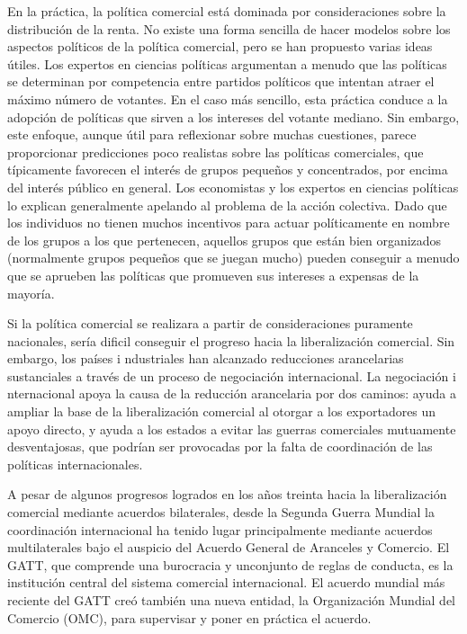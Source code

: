 \documentclass[10pt,a4paper]{article}
\begin{document}
{    En la práctica, la política comercial está dominada por consideraciones sobre la distribución de la renta. No existe una forma sencilla de hacer modelos sobre los aspectos políticos de la política comercial, pero se han propuesto varias ideas útiles. Los expertos en ciencias políticas argumentan a menudo que las políticas se determinan por competencia entre partidos políticos que intentan atraer el máximo número de votantes. En el caso más sencillo, esta práctica conduce a la adopción de políticas que sirven a los intereses del votante mediano. Sin embargo, este enfoque, aunque útil para reflexionar sobre muchas cuestiones, parece proporcionar predicciones poco realistas sobre las políticas comerciales, que típicamente favorecen el interés de grupos pequeños y concentrados, por encima del interés público en general. Los economistas y los expertos en ciencias políticas lo explican generalmente apelando al problema de la acción colectiva. Dado que los individuos no tienen muchos incentivos para actuar políticamente en nombre de los grupos a los que pertenecen, aquellos grupos que están bien organizados (normalmente grupos pequeños que se juegan mucho) pueden conseguir a menudo que se aprueben las políticas que promueven sus intereses a expensas de la mayoría. 
    
    Si la política comercial se realizara a partir de consideraciones puramente nacionales, sería dificil conseguir el progreso hacia la liberalización comercial. Sin embargo, los países i ndustriales han alcanzado reducciones arancelarias sustanciales a través de un proceso de negociación internacional. La negociación i nternacional apoya la causa de la reducción arancelaria por dos caminos: ayuda a ampliar la base de la liberalización comercial al otorgar a los exportadores un apoyo directo, y ayuda a los estados a evitar las guerras comerciales mutuamente desventajosas, que podrían ser provocadas por la falta de coordinación de las políticas internacionales.
    
    A pesar de algunos progresos logrados en los años treinta hacia la liberalización comercial mediante acuerdos bilaterales, desde la Segunda Guerra Mundial la coordinación internacional ha tenido lugar principalmente mediante acuerdos multilaterales bajo el auspicio del Acuerdo General de Aranceles y Comercio. El GATT, que comprende una burocracia y unconjunto de reglas de conducta, es la institución central del sistema comercial internacional. El acuerdo mundial más reciente del GATT creó también una nueva entidad, la Organización Mundial del Comercio (OMC), para supervisar y poner en práctica el acuerdo.
    
}
\end{document}
